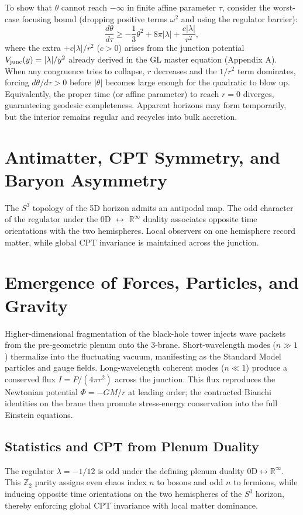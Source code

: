 \documentclass[11pt,a4paper,oneside]{article}
\begin{document}
To show that $\theta$ cannot reach $-\infty$ in finite affine parameter $\tau$, consider the worst-case focusing bound (dropping positive terms $\omega^2$ and using the regulator barrier):
\[
\frac{d\theta}{d\tau} \ge -\frac13\theta^2 + 8\pi|\lambda| + \frac{c|\lambda|}{r^2},
\]
where the extra $+c|\lambda|/r^2$ ($c>0$) arises from the junction potential $V_{\rm junc}(y)=|\lambda|/y^2$ already derived in the GL master equation (Appendix A). When any congruence tries to collapse, $r$ decreases and the $1/r^2$ term dominates, forcing $d\theta/d\tau >0$ before $|\theta|$ becomes large enough for the quadratic to blow up. Equivalently, the proper time (or affine parameter) to reach $r=0$ diverges, guaranteeing geodesic completeness. Apparent horizons may form temporarily, but the interior remains regular and recycles into bulk accretion.

\section{Antimatter, CPT Symmetry, and Baryon Asymmetry}
The $S^3$ topology of the 5D horizon admits an antipodal map. The odd character of the regulator under the 0D $\leftrightarrow$ $\mathbb{R}^\infty$ duality associates opposite time orientations with the two hemispheres. Local observers on one hemisphere record matter, while global CPT invariance is maintained across the junction.

\section{Emergence of Forces, Particles, and Gravity}

Higher-dimensional fragmentation of the black-hole tower injects wave packets from the pre-geometric plenum onto the 3-brane. Short-wavelength modes ($n \gg 1$) thermalize into the fluctuating vacuum, manifesting as the Standard Model particles and gauge fields. Long-wavelength coherent modes ($n \ll 1$) produce a conserved flux $I = P/(4\pi r^2)$ across the junction. This flux reproduces the Newtonian potential $\Phi = -GM/r$ at leading order; the contracted Bianchi identities on the brane then promote stress-energy conservation into the full Einstein equations.

\subsection{Statistics and CPT from Plenum Duality}
The regulator $\lambda = -1/12$ is odd under the defining plenum duality $0\mathrm{D} \leftrightarrow \mathbb{R}^\infty$. This $\mathbb{Z}_2$ parity assigns even chaos index $n$ to bosons and odd $n$ to fermions, while inducing opposite time orientations on the two hemispheres of the $S^3$ horizon, thereby enforcing global CPT invariance with local matter dominance.
\end{document}

